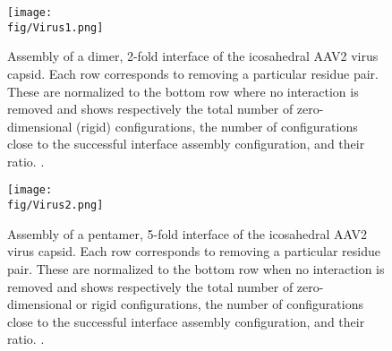 \begin{figure}
\texttt{[image: \\fig/Virus1.png]}

\caption{Assembly of a dimer, 2-fold interface of
the icosahedral AAV2 virus capsid. Each row corresponds to removing a
particular residue pair. These are normalized to the bottom row where no
interaction is removed and shows respectively the total number of
zero-dimensional (rigid) configurations, the number of configurations close to
the successful interface assembly configuration, and their ratio.
\protect{}.}
\label{fig:virus_comparison_dimer}
\end{figure}

\begin{figure}
\texttt{[image: \\fig/Virus2.png]}
\caption{Assembly of a pentamer, 5-fold interface
of the icosahedral AAV2 virus capsid. Each row corresponds to removing a
particular residue pair. These are normalized to the bottom row when no
interaction is removed and shows respectively the total number of
zero-dimensional or rigid configurations, the number of configurations close to
the successful interface assembly configuration, and their ratio.
\protect{}.}
\label{fig:virus_comparison_pentamer}
\end{figure}



